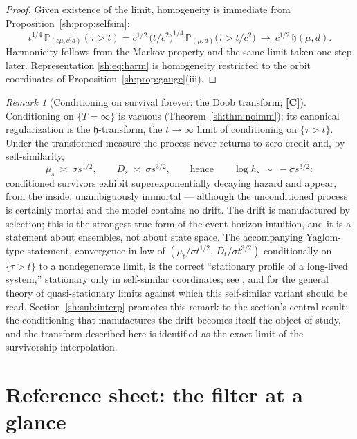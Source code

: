 \documentclass[11pt]{article}
\numberwithin{equation}{section}
\theoremstyle{plain}
\theoremstyle{definition}
\theoremstyle{remark}
\newtheorem{remark}[theorem]{Remark}
\newcommand{\PP}{\mathbb{P}}
\newcommand{\hm}{\mathfrak{h}}
\begin{document}
\begin{proof}
Given existence of the limit, homogeneity is immediate from
Proposition~\ref{sh:prop:selfsim}:
\[
t^{1/4}\,\PP_{(c\mu,c^3d)}(\tau>t)
= c^{1/2}\,\bigl(t/c^2\bigr)^{1/4}\,\PP_{(\mu,d)}\bigl(\tau>t/c^{2}\bigr)
\ \longrightarrow\ c^{1/2}\,\hm(\mu,d).
\]
Harmonicity follows from the Markov property and the same limit taken one
step later. Representation \eqref{sh:eq:harm} is homogeneity restricted to
the orbit coordinates of Proposition~\ref{sh:prop:gauge}(iii).
\end{proof}

\begin{remark}[Conditioning on survival forever: the Doob transform;
\textbf{[C]}]\label{sh:rem:doob}
Conditioning on $\{T=\infty\}$ is vacuous (Theorem~\ref{sh:thm:noimm});
its canonical regularization is the $\hm$-transform, the
$t\to\infty$ limit of conditioning on $\{\tau>t\}$. Under the transformed
measure the process never returns to zero credit and, by self-similarity,
\[
\mu_s\ \asymp\ \sigma s^{1/2},\qquad D_s\ \asymp\ \sigma s^{3/2},
\qquad\text{hence}\qquad \log h_s\ \sim\ -\sigma s^{3/2}:
\]
conditioned survivors exhibit superexponentially decaying hazard and
appear, from the inside, unambiguously immortal --- although the
unconditioned process is certainly mortal and the model contains no drift.
The drift is manufactured by selection; this is the strongest true form of
the event-horizon intuition, and it is a statement about ensembles, not
about state space. The accompanying Yaglom-type statement, convergence
in law of $(\mu_t/\sigma t^{1/2},\,D_t/\sigma t^{3/2})$ conditionally on
$\{\tau>t\}$ to a nondegenerate limit, is the correct
``stationary profile of a long-lived system,'' stationary only in
self-similar coordinates; see \cite{GJW99,AS15}, and \cite{MV12} for
the general theory of quasi-stationary limits against which this
self-similar variant should be read.
Section~\ref{sh:sub:interp} promotes this remark to the section's central
result: the conditioning that manufactures the drift becomes itself the
object of study, and the transform described here is identified as the
exact limit of the survivorship interpolation.
\end{remark}

\section{Reference sheet: the filter at a glance}\label{app:sheet}

\label{sh:sub:sheet}
\end{document}

